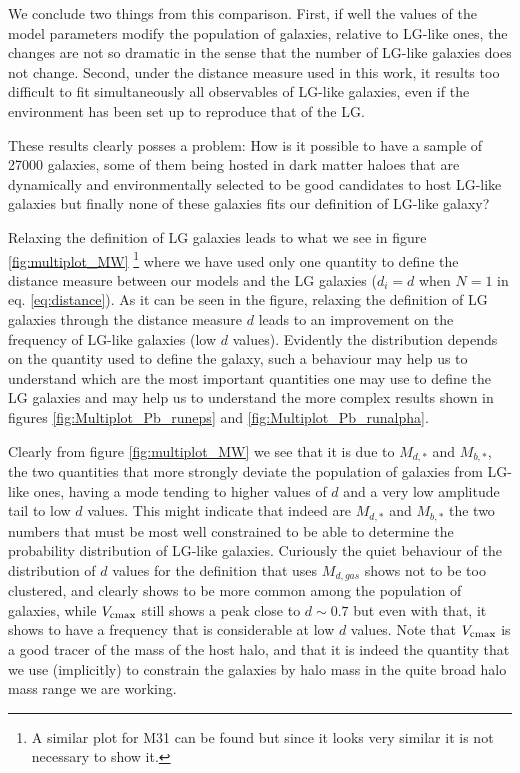 \documentclass[useAMS,usenatbib]{mn2e}
\begin{document}
We conclude two things from this comparison. First, if well the values
of the model parameters modify the population of galaxies, relative to
LG-like ones, the changes are not so dramatic in the sense that the
number of LG-like galaxies does not change. Second, under the distance
measure used in this work, it results too difficult to fit
simultaneously all observables of LG-like galaxies, even if the
environment has been set up to reproduce that of the LG.



These results clearly posses a problem: How is it possible to have a
sample of 27000 galaxies, some of them being hosted in dark matter
haloes that are dynamically and environmentally selected to be good
candidates to host LG-like galaxies but finally none of these galaxies
fits our definition of LG-like galaxy?

Relaxing the definition of LG galaxies leads to what we see in figure
\ref{fig:multiplot_MW} \footnote{A similar plot for M31 can be found
  but since it looks very similar it is not necessary to show it.}
where we have used only one quantity to define the distance measure
between our models and the LG galaxies ($d_i = d$ when $N=1$ in
eq. \ref{eq:distance}). As it can be seen in the figure, relaxing the
definition of LG galaxies through the distance measure $d$ leads to an
improvement on the frequency of LG-like galaxies (low $d$
values). Evidently the distribution depends on the quantity used to
define the galaxy, such a behaviour may help us to understand which
are the most important quantities one may use to define the LG
galaxies and may help us to understand the more complex results shown
in figures \ref{fig:Multiplot_Pb_runeps} and
\ref{fig:Multiplot_Pb_runalpha}.

Clearly from figure \ref{fig:multiplot_MW} we see that it is due to
$M_{d,*}$ and $M_{b,*}$, the two quantities that more strongly deviate
the population of galaxies from LG-like ones, having a mode tending to
higher values of $d$ and a very low amplitude tail to low $d$
values. This might indicate that indeed are $M_{d,*}$ and $M_{b,*}$
the two numbers that must be most well constrained to be able to
determine the probability distribution of LG-like galaxies. Curiously
the quiet behaviour of the distribution of $d$ values for the
definition that uses $M_{d,gas}$ shows not to be too clustered, and
clearly shows to be more common among the population of galaxies,
while $V_{\rm cmax}$ still shows a peak close to $d\sim0.7$ but even
with that, it shows to have a frequency that is considerable at low
$d$ values. Note that $V_{\rm cmax}$ is a good tracer of the mass of
the host halo, and that it is indeed the quantity that we use
(implicitly) to constrain the galaxies by halo mass in the quite broad
halo mass range we are working.
\end{document}
